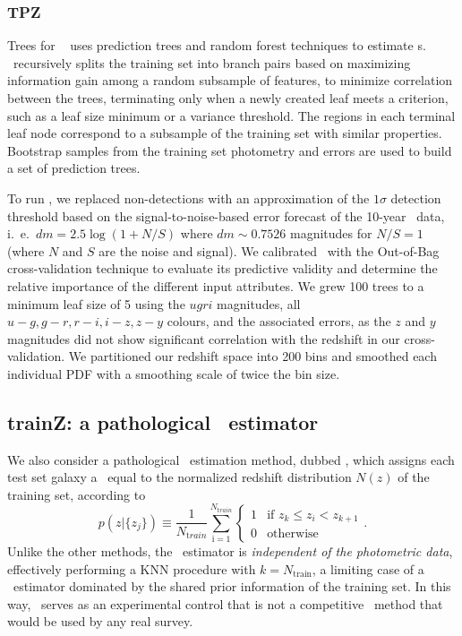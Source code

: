 \subsubsection{TPZ}
\label{sec:tpz}

Trees for \Pz\ \citep[\tpz,][]{Carrasco_Kind:13,Carrascokind:14} uses prediction trees and random forest techniques to estimate \pzpdf s.
\tpz\ recursively splits the training set into branch pairs based on maximizing information gain among a random subsample of features, to minimize correlation between the trees, terminating only when a newly created leaf meets a criterion, such as a leaf size minimum or a variance threshold.
The regions in each terminal leaf node correspond to a subsample of the training set with similar properties.
Bootstrap samples from the training set photometry and errors are used to build a set of prediction trees.

To run \tpz, we replaced non-detections with an approximation of the $1\sigma$ detection threshold based on the signal-to-noise-based error forecast of the 10-year \lsst\ data, i.~e.~$dm = 2.5 \log (1 + N/S)$ where $dm \sim 0.7526$ magnitudes for $N/S = 1$ (where $N$ and $S$ are the noise and signal).
We calibrated \tpz\ with the Out-of-Bag cross-validation technique \citep{Breiman:84,Carrasco_Kind:13} to evaluate its predictive validity and determine the relative importance of the different input attributes.
We grew 100 trees to a minimum leaf size of 5 using the $ugri$ magnitudes, all $u-g, g-r, r-i, i-z, z-y$ colours, and the associated errors, as the $z$ and $y$ magnitudes did not show significant correlation with the redshift in our cross-validation.
We partitioned our redshift space into 200 bins and smoothed each individual PDF with a smoothing scale of twice the bin size.

\subsection{trainZ: a pathological \pzpdf\ estimator}
\label{sec:trainz}

We also consider a pathological \pzpdf\ estimation method, dubbed \trainz, which assigns each test set galaxy a \pzpdf\ equal to the normalized redshift distribution $N(z)$ of the training set, according to
\begin{equation}
	p(z \vert \{z_{j}\}) \equiv \frac{1}{N_{ \mathrm train}}\sum_{\mathrm i=1}^{N_{\mathrm train}} \begin{cases} 1 & \text{if\ } z_{k}\leq z_{i} < z_{k+1}\\ 0 & \text{otherwise} \end{cases}.
\end{equation}
Unlike the other methods, the \trainz\ estimator is \textit{independent of the photometric data}, effectively performing a KNN procedure with $k=N_{\mathrm{train}}$, a limiting case of a \pzpdf\ estimator dominated by the shared prior information of the training set.
In this way, \trainz\ serves as an experimental control that is not a competitive \pzpdf\ method that would be used by any real survey.

